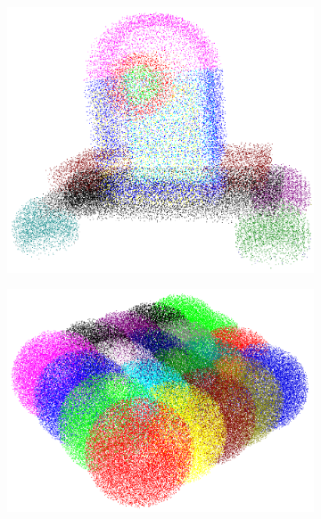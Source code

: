 \begin{figure}
	\centering
	\begin{subfigure}[b]{0.30\linewidth}
		\centering
		\includegraphics[width=\textwidth]{figures/m0_pc.png}
	\end{subfigure}	 
	\begin{subfigure}[b]{0.3\linewidth}
		\centering
		\includegraphics[width=\textwidth]{figures/m2_pc.png}
	\end{subfigure}	
	\begin{subfigure}[b]{0.3\linewidth}
		\centering

\end{subfigure}
\end{figure}
